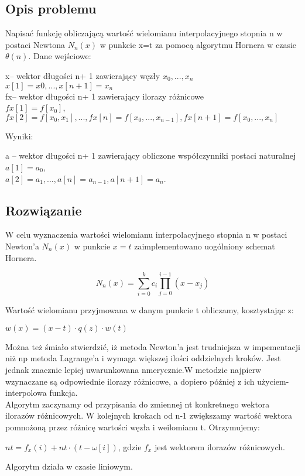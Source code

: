\documentclass[11pt]{article}
\begin{document}
\begin{flushleft}
\subsection{Opis problemu}
Napisać funkcję obliczającą wartość wielomianu interpolacyjnego stopnia n w postaci Newtona $N_n(x)$ w punkcie x=t za pomocą algorytmu Hornera w czasie $\theta(n)$. Dane wejściowe:\\
\begin{center}
x– wektor długości n+ 1 zawierający węzły $x_0, ...,x_n$\\$x[1]=x0,...,x[n+1]=x_n$\\
fx– wektor długości n+ 1 zawierający ilorazy  różnicowe \\$fx[1]=f[x_0]$,\\
$fx[2]=f[x_0, x_1],...,fx[n]=f[x_0, . . . , x_{n−1}],fx[n+1]=f[x_0, . . . , x_n]$
\end{center}
\begin{flushleft}
Wyniki:
\begin{center}
a – wektor długości n+ 1 zawierający obliczone współczynniki postaci naturalnej\\
$a[1]=a_0$,\\
$a[2]=a_1,...,a[n]
=a_{n−1},a[n+1]=a_n$.\\
\end{center}
\end{flushleft}
\subsection{Rozwiązanie}
W celu wyznaczenia wartości wielomianu interpolacyjnego stopnia n w postaci Newton'a $N_n(x)$ w punkcie $x=t$ zaimplementowano uogólniony schemat Hornera.\\
\begin{center}
$$N_n(x)=\sum^k_{i=0}c_i\prod^{i-1}_{j=0}(x-x_j)$$
\end{center}
Wartość wielomianu przyjmowana w danym punkcie t obliczamy, kosztystając z:\\
\begin{center}$w(x)=(x-t)\cdot q(z)\cdot w(t)$\end{center}
Można też śmiało stwierdzić, iż metoda Newton'a jest trudniejsza w impementacji niż np metoda Lagrange'a i wymaga większej ilości oddzielnych kroków. Jest jednak znacznie lepiej uwarunkowana nmerycznie.W metodzie najpierw wzynaczane są odpowiednie ilorazy różnicowe, a dopiero później z ich użyciem- interpolowa funkcja.\\
Algorytm zaczynamy od przypisania do zmiennej nt konkretnego wektora ilorazów różnicowych. W kolejnych krokach od n-1 zwiększamy wartość wektora pomnożoną przez różnicę wartości węzła i weilomianu t. Otrzymujemy:\\
\begin{center}
$nt=f_x(i)+nt\cdot (t-\omega[i])$, gdzie $f_x$ jest wektorem ilorazów różnicowych.\\
\end{center}
Algorytm działa w czasie liniowym.
\newpage

\end{flushleft}
\end{document}
